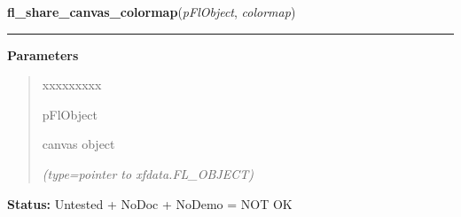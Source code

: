 \hspace{.8\funcindent}\begin{boxedminipage}{\funcwidth}

    \raggedright \textbf{fl\_share\_canvas\_colormap}(\textit{pFlObject}, \textit{colormap})

    \vspace{-1.5ex}

    \rule{\textwidth}{0.5\fboxrule}
\setlength{\parskip}{2ex}
\setlength{\parskip}{1ex}
      \textbf{Parameters}
      \vspace{-1ex}

      \begin{quote}
        \begin{Ventry}{xxxxxxxxx}

          \item[pFlObject]

          canvas object

            {\it (type=pointer to xfdata.FL\_OBJECT)}

        \end{Ventry}

      \end{quote}

\textbf{Status:} Untested + NoDoc + NoDemo = NOT OK



    \end{boxedminipage}

    \label{xformslib:flcanvas:fl_clear_canvas}

    \vspace{0.5ex}

